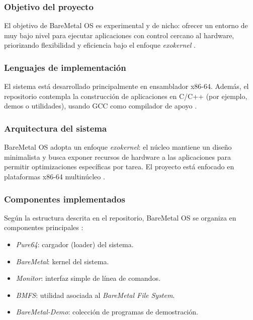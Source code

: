 \subsubsection{Objetivo del proyecto}
El objetivo de BareMetal OS es experimental y de nicho: ofrecer un entorno de muy bajo nivel para ejecutar aplicaciones con control cercano al hardware, priorizando flexibilidad y eficiencia bajo el enfoque \textit{exokernel} \cite{bmos_purpose}.

\subsubsection{Lenguajes de implementación}
El sistema está desarrollado principalmente en ensamblador x86-64. Además, el repositorio contempla la construcción de aplicaciones en C/C++ (por ejemplo, demos o utilidades), usando GCC como compilador de apoyo \cite{bmos_purpose}.

\subsubsection{Arquitectura del sistema}
BareMetal OS adopta un enfoque \textit{exokernel}: el núcleo mantiene un diseño minimalista y busca exponer recursos de hardware a las aplicaciones para permitir optimizaciones específicas por tarea. El proyecto está enfocado en plataformas x86-64 multinúcleo \cite{bmos_purpose}.

\subsubsection{Componentes implementados}
Según la estructura descrita en el repositorio, BareMetal OS se organiza en componentes principales \cite{bmos_purpose}:
\begin{itemize}
    \item \textit{Pure64}: cargador (loader) del sistema.
    \item \textit{BareMetal}: kernel del sistema.
    \item \textit{Monitor}: interfaz simple de línea de comandos.
    \item \textit{BMFS}: utilidad asociada al \textit{BareMetal File System}.
    \item \textit{BareMetal-Demo}: colección de programas de demostración.
\end{itemize}

